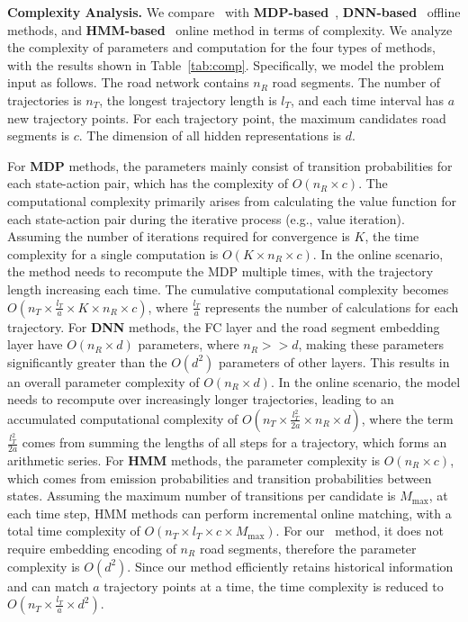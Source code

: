 
\noindent \textbf{Complexity Analysis.} We compare \textbf{\modelName}~with \textbf{MDP-based}~\cite{MDPMM}, \textbf{DNN-based}~\cite{mtrajrec, l2mm, graphmm} offline methods, and \textbf{HMM-based}~\cite{HMM, FMM, AMM} online method in terms of complexity. We analyze the complexity of parameters and computation for the four types of methods, with the results shown in Table~\ref{tab:comp}. Specifically, we model the problem input as follows. The road network contains $n_R$ road segments. The number of trajectories is $n_T$, the longest trajectory length is $l_T$, and each time interval has $a$ new trajectory points. For each trajectory point, the maximum candidates road segments is $c$. The dimension of all hidden representations is $d$.

For \textbf{MDP} methods, the parameters mainly consist of transition probabilities for each state-action pair, which has the complexity of $O(n_R \times c)$. The computational complexity primarily arises from calculating the value function for each state-action pair during the iterative process (e.g., value iteration). Assuming the number of iterations required for convergence is $K$, the time complexity for a single computation is $O(K \times n_R \times c)$. In the online scenario, the method needs to recompute the MDP multiple times, with the trajectory length increasing each time. The cumulative computational complexity becomes $O( n_T\times \frac{l_T}{a} \times K \times n_R \times c)$, where $\frac{l_T}{a}$ represents the number of calculations for each trajectory.
For \textbf{DNN} methods, the FC layer and the road segment embedding layer have $O(n_R \times d)$ parameters, where $n_R >> d$, making these parameters significantly greater than the $O(d^2)$ parameters of other layers. This results in an overall parameter complexity of $O(n_R \times d)$. In the online scenario, the model needs to recompute over increasingly longer trajectories, leading to an accumulated computational complexity of $O(n_T\times \frac{l_T^2}{2a}\times n_R \times d)$, where the term $\frac{l_T^2}{2a}$ comes from summing the lengths of all steps for a trajectory, which forms an arithmetic series.
For \textbf{HMM} methods, the parameter complexity is $O(n_R \times c)$, which comes from emission probabilities and transition probabilities between states. Assuming the maximum number of transitions per candidate is $M_{\max}$, at each time step, HMM methods can perform incremental online matching, with a total time complexity of $O(n_T\times l_T \times c \times M_{\max})$. 
For our \textbf{\modelName}~method, it does not require embedding encoding of $n_R$ road segments, therefore the parameter complexity is $O(d^2)$. Since our method efficiently retains historical information and can match $a$ trajectory points at a time, the time complexity is reduced to $O(n_T \times \frac{l_T}{a} \times d^2)$.

